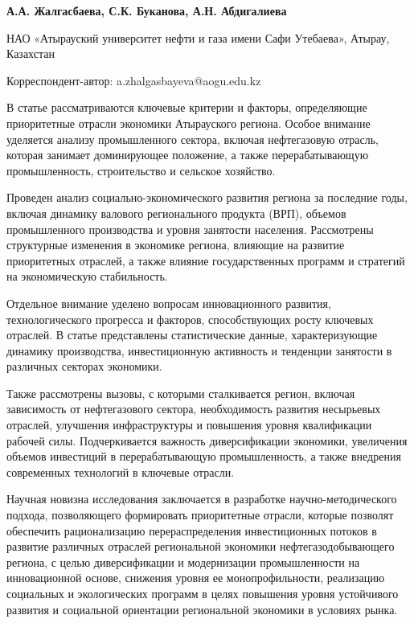 
\begin{articleheader}

{\bfseries
А.А. Жалгасбаева\textsuperscript{\envelope },
С.К. Буканова,
А.Н. Абдигалиева
}
\end{articleheader}

\begin{affiliation}
НАО «Атырауский университет нефти и газа имени Сафи Утебаева», Атырау, Казахстан

\textsuperscript{\envelope }Корреспондент-автор: a.zhalgasbayeva@aogu.edu.kz
\end{affiliation}

В статье рассматриваются ключевые критерии и факторы, определяющие
приоритетные отрасли экономики Атырауского региона. Особое внимание
уделяется анализу промышленного сектора, включая нефтегазовую отрасль,
которая занимает доминирующее положение, а также перерабатывающую
промышленность, строительство и сельское хозяйство.

Проведен анализ социально-экономического развития региона за последние
годы, включая динамику валового регионального продукта (ВРП), объемов
промышленного производства и уровня занятости населения. Рассмотрены
структурные изменения в экономике региона, влияющие на развитие
приоритетных отраслей, а также влияние государственных программ и
стратегий на экономическую стабильность.

Отдельное внимание уделено вопросам инновационного развития,
технологического прогресса и факторов, способствующих росту ключевых
отраслей. В статье представлены статистические данные, характеризующие
динамику производства, инвестиционную активность и тенденции занятости в
различных секторах экономики.

Также рассмотрены вызовы, с которыми сталкивается регион, включая
зависимость от нефтегазового сектора, необходимость развития несырьевых
отраслей, улучшения инфраструктуры и повышения уровня квалификации
рабочей силы. Подчеркивается важность диверсификации экономики,
увеличения объемов инвестиций в перерабатывающую промышленность, а также
внедрения современных технологий в ключевые отрасли.

Научная новизна исследования заключается в разработке
научно-методического подхода, позволяющего формировать приоритетные
отрасли, которые позволят обеспечить рационализацию перераспределения
инвестиционных потоков в развитие различных отраслей региональной
экономики нефтегазодобывающего региона, с целью диверсификации и
модернизации промышленности на инновационной основе, снижения уровня ее
монопрофильности, реализацию социальных и экологических программ в целях
повышения уровня устойчивого развития и социальной ориентации
региональной экономики в условиях рынка.


